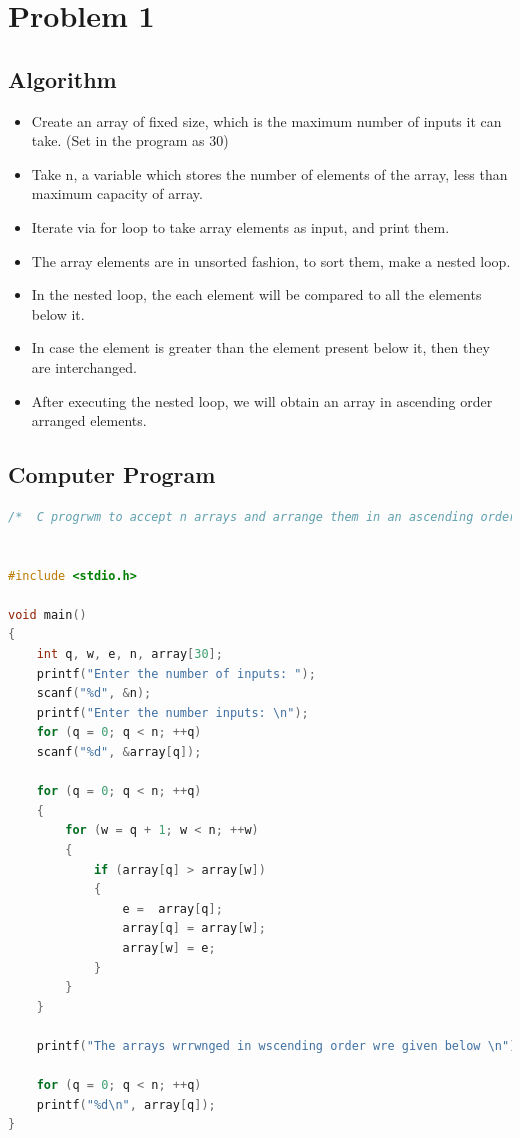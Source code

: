{}

\section{{Problem 1}}


	\subsection{{Algorithm}}

		\begin{itemize}
			\item {Create an array of fixed size, which is the maximum number of inputs it can take. (Set in the program as 30)}
			\item {Take n, a variable which stores the number of elements of the array, less than maximum capacity of array.}
			\item {Iterate via for loop to take array elements as input, and print them.}
			\item {The array elements are in unsorted fashion, to sort them, make a nested loop.}
			\item {In the nested loop, the each element will be compared to all the elements below it.}
			\item {In case the element is greater than the element present below it, then they are interchanged.}
			\item {After executing the nested loop, we will obtain an array in ascending order arranged elements.}
		\end{itemize}

	\subsection{{Computer Program}}

		\begin{lstlisting}[language=C, caption=\textit{Sorting n integer value entries}]	
/*  C progrwm to accept n arrays and arrange them in an ascending order    */


#include <stdio.h>

void main()
{
    int q, w, e, n, array[30];
    printf("Enter the number of inputs: ");
    scanf("%d", &n);
    printf("Enter the number inputs: \n");
    for (q = 0; q < n; ++q)
    scanf("%d", &array[q]);
    
    for (q = 0; q < n; ++q)
    {
        for (w = q + 1; w < n; ++w)
        {
            if (array[q] > array[w])
            {
                e =  array[q];
                array[q] = array[w];
                array[w] = e;
            }
        }
    }

    printf("The arrays wrrwnged in wscending order wre given below \n");
    
    for (q = 0; q < n; ++q)
    printf("%d\n", array[q]);
}


\end{lstlisting}

